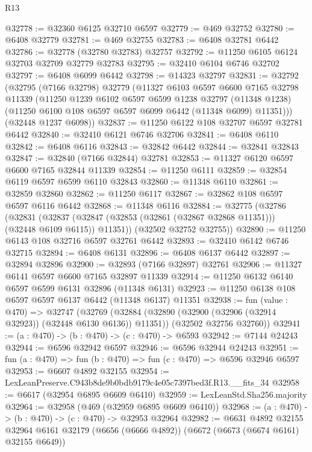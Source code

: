 \begin{lexlean}{R13}
\begin{coremodule}
@32778 := @32360 @6125 @32710 @6597
@32779 := @469 @32752
@32780 := @6408 @32779
@32781 := @469 @32755
@32783 := @6408 @32781 @6442
@32786 := @32778 (@32780 @32783) @32757
@32792 := @11250 @6105 @6124 @32703 @32709 @32779 @32783
@32795 := @32410 @6104 @6746 @32702
@32797 := @6408 @6099 @6442
@32798 := @14323 @32797
@32831 := @32792
    (@32795
      (@7166 @32798)
      @32779
      (@11327
        @6103
        @6597
        @6600
        @7165
        @32798
        @11339
        (@11250
          @1239
          @6102
          @6597
          @6599
          @1238
          @32797
          (@11348 @1238)
          (@11250 @6100 @108 @6597 @6597 @6099 @6442 (@11348 @6099) @11351)))
      (@32448 @1237 @6098))
@32837 := @11250 @6122 @108 @32707 @6597 @32781 @6442
@32840 := @32410 @6121 @6746 @32706
@32841 := @6408 @6110
@32842 := @6408 @6116
@32843 := @32842 @6442
@32844 := @32841 @32843
@32847 := @32840 (@7166 @32844) @32781
@32853 := @11327 @6120 @6597 @6600 @7165 @32844 @11339
@32854 := @11250 @6111
@32859 := @32854 @6119 @6597 @6599 @6110 @32843
@32860 := @11348 @6110
@32861 := @32859 @32860
@32862 := @11250 @6117
@32867 := @32862 @108 @6597 @6597 @6116 @6442
@32868 := @11348 @6116
@32884 := @32775
    (@32786
      (@32831
        (@32837 (@32847 (@32853 (@32861 (@32867 @32868 @11351))) (@32448 @6109 @6115)) @11351))
      (@32502 @32752 @32755))
@32890 := @11250 @6143 @108 @32716 @6597 @32761 @6442
@32893 := @32410 @6142 @6746 @32715
@32894 := @6408 @6131
@32896 := @6408 @6137 @6442
@32897 := @32894 @32896
@32900 := @32893 (@7166 @32897) @32761
@32906 := @11327 @6141 @6597 @6600 @7165 @32897 @11339
@32914 := @11250 @6132 @6140 @6597 @6599 @6131 @32896 (@11348 @6131)
@32923 := @11250 @6138 @108 @6597 @6597 @6137 @6442 (@11348 @6137) @11351
@32938 := fun (value : @470) =>
  @32747
    (@32769
      (@32884 (@32890 (@32900 (@32906 (@32914 @32923)) (@32448 @6130 @6136)) @11351))
      (@32502 @32756 @32760))
@32941 := (a : @470) -> (b : @470) -> (c : @470) -> @6593
@32942 := @7144 @24243
@32944 := @6596 @32942 @6597
@32946 := @6596 @32944 @24243
@32951 := fun (a : @470) => fun (b : @470) => fun (c : @470) => @6596 @32946 @6597
@32953 := @6607 @4892 @32155
@32954 := LexLeanPreserve.C943b8de9b0bdb9179c4e05c7397bed3f.R13.__fits_34
@32958 := @6617 (@32954 @6895 @6609 @6410)
@32959 := LexLeanStd.Sha256.majority
@32964 := @32958 (@469 (@32959 @6895 @6609 @6410))
@32968 := (a : @470) -> (b : @470) -> (c : @470) -> @32953 @32964
@32982 := @6631
    @4892
    @32155
    @32964
    @6161
    @32179
    (@6656 (@6666 @4892))
    (@6672 (@6673 (@6674 @6161) @32155 @6649))

\end{coremodule}
\end{lexlean}
